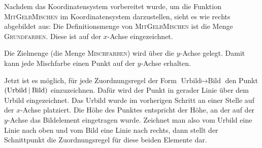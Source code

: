 \documentclass[../../main.tex]{subfiles}
\begin{document}
\begin{example}{}
    Nachdem das Koordinatensystem vorbereitet wurde, um die Funktion \textsc{MitGelbMischen} im Koordinatensystem darzustellen, sieht es wie rechts abgebildet aus: Die Definitionsmenge von \textsc{MitGelbMischen} ist die Menge \textsc{Grundfarben}. Diese ist auf der $x$-Achse eingezeichnet.
    
    Die Zielmenge (die Menge \textsc{Mischfarben}) wird über die $y$-Achse gelegt. Damit kann jede Mischfarbe einen Punkt auf der $y$-Achse erhalten.
\end{example}

Jetzt ist es möglich, für jede Zuordnungsregel der Form $\text{Urbild}\mapsto\text{Bild}$ den Punkt $\left(\text{Urbild} \:\middle|\: \text{Bild}\right)$ einzuzeichnen. Dafür wird der Punkt in gerader Linie über dem Urbild eingezeichnet. Das Urbild wurde im vorherigen Schritt an einer Stelle auf der $x$-Achse platziert. Die Höhe des Punktes entspricht der Höhe, an der auf der $y$-Achse das Bildelement eingetragen wurde. Zeichnet man also vom Urbild eine Linie nach oben und vom Bild eine Linie nach rechts, dann stellt der Schnittpunkt die Zuordnungsregel für diese beiden Elemente dar.
\end{document}
